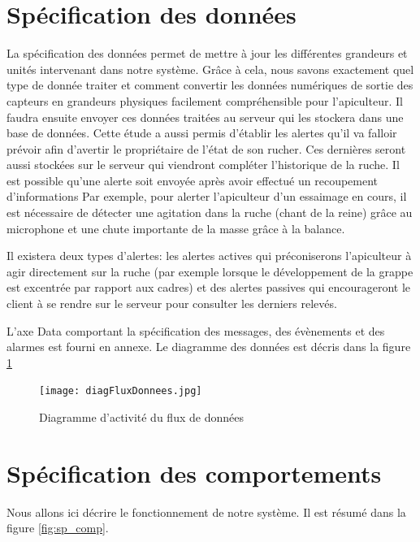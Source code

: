 \clearpage

\section{Spécification des données}

La spécification des données permet de mettre à jour les différentes grandeurs 
et unités intervenant dans notre système. Grâce à cela, nous savons exactement 
quel type de donnée traiter et comment convertir les données numériques de sortie des capteurs en grandeurs physiques facilement compréhensible pour l'apiculteur. Il faudra ensuite envoyer ces données traitées au serveur qui les stockera dans une base de données. Cette étude a aussi permis d'établir les alertes qu'il va falloir prévoir afin d'avertir le propriétaire de l'état de son rucher. Ces dernières seront aussi stockées sur le serveur qui viendront compléter l'historique de la ruche. Il est possible qu'une alerte soit envoyée après avoir effectué un recoupement d'informations Par exemple, pour alerter l'apiculteur d'un essaimage en cours, il est nécessaire de détecter une agitation dans la ruche (chant de la reine) grâce au microphone et une chute importante de la masse grâce à la balance. 

Il existera deux types d'alertes: les alertes actives qui préconiserons l'apiculteur à agir directement sur la ruche (par exemple lorsque le développement de la grappe est excentrée par rapport aux cadres) et des alertes passives qui encourageront le client à se rendre sur le serveur pour consulter les derniers relevés.   

L'axe Data comportant la spécification des messages, des évènements et des alarmes est fourni en annexe.
Le diagramme des données est décris dans la figure \ref{fig:donnees} 



\begin{figure}[h!]
\centering\texttt{[image: diagFluxDonnees.jpg]}
\caption{\label{fig:donnees} Diagramme d'activité du flux de données}
\end{figure}

\clearpage

\section{Spécification des comportements}

Nous allons ici décrire le fonctionnement de notre système. Il est résumé dans la figure \ref{fig:sp_comp}.

